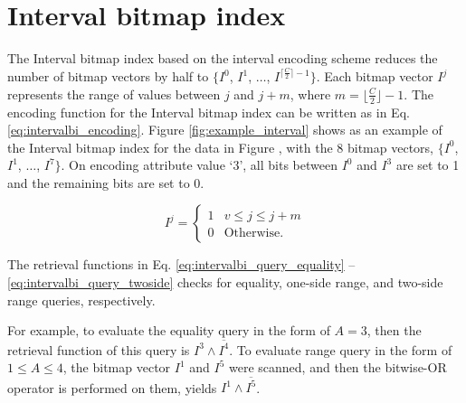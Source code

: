 \documentclass[../main/thesis.tex]{subfiles}
\begin{document}
\begin{figure*}[!b]
	\centering
	\hfil
	\caption{An example of the Interval bitmap index: encoding of attribute $A$ with $C=15$.}
	\label{fig:example_interval}
\end{figure*}

\section{Interval bitmap index}
The Interval bitmap index based on the interval encoding scheme \cite{IntervalBI} reduces the number of bitmap vectors by half to $\{I^0$, $I^1$, $\dots$, $I^{\lceil\frac{C}{2}\rceil -1}\}$. Each bitmap vector $I^j$ represents the range of values between $j$ and $j + m$, where $m = \lfloor\frac{C}{2}\rfloor -1$. The encoding function for the Interval bitmap index can be written as in Eq. \eqref{eq:intervalbi_encoding}. Figure \ref{fig:example_interval} shows as an example of the Interval bitmap index for the data in Figure , with the 8 bitmap vectors, $\{I^0$, $I^1$, $\dots$, $I^7\}$. On encoding attribute value `3', all bits between $I^0$ and $I^3$ are set to 1 and the remaining bits are set to 0.

\begin{equation}
\label{eq:intervalbi_encoding}
I^j=
\begin{cases}
1 & v \leq j \leq j+m \\
0 & \text{Otherwise}.
\end{cases}
\end{equation}

The retrieval functions in Eq. \eqref{eq:intervalbi_query_equality} -- \eqref{eq:intervalbi_query_twoside} checks for equality, one-side range, and two-side range queries, respectively.

For example, to evaluate the equality query in the form of $A=3$, then the retrieval function of this query is $I^3 \wedge \overline{I^4}$. To evaluate range query in the form of $1\leq A \leq 4$, the bitmap vector $I^1$ and $I^5$ were scanned, and then the bitwise-OR operator is performed on them, yields $I^1 \wedge \overline{I^5}$.
\end{document}
